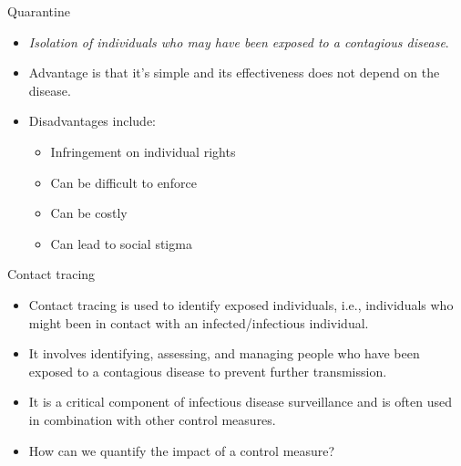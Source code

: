 \documentclass[
  ignorenonframetext,
]{beamer}
\providecommand{\tightlist}{%
  \setlength{\itemsep}{0pt}\setlength{\parskip}{0pt}}\usepackage{longtable,booktabs,array}
\begin{document}
\begin{frame}
\begin{block}{Quarantine}
\label{quarantine}
\begin{itemize}
\tightlist
\item
  \emph{Isolation of individuals who may have been exposed to a
  contagious disease}.
\item
  Advantage is that it's simple and its effectiveness does not depend on
  the disease.
\item
  Disadvantages include:

  \begin{itemize}
  \tightlist
  \item
    Infringement on individual rights
  \item
    Can be difficult to enforce
  \item
    Can be costly
  \item
    Can lead to social stigma
  \end{itemize}
\end{itemize}
\end{block}
\end{frame}

\begin{frame}
\begin{block}{Contact tracing}
\label{contact-tracing}
\begin{itemize}
\tightlist
\item
  Contact tracing is used to identify exposed individuals, i.e.,
  individuals who might been in contact with an infected/infectious
  individual.
\item
  It involves identifying, assessing, and managing people who have been
  exposed to a contagious disease to prevent further transmission.
\item
  It is a critical component of infectious disease surveillance and is
  often used in combination with other control measures.
\end{itemize}
\end{block}
\end{frame}

\begin{frame}
\begin{tcolorbox}[enhanced jigsaw, toprule=.15mm, opacityback=0, bottomtitle=1mm, opacitybacktitle=0.6, colframe=quarto-callout-caution-color-frame, titlerule=0mm, breakable, colback=white, title={Discussion}, left=2mm, colbacktitle=quarto-callout-caution-color!10!white, arc=.35mm, coltitle=black, bottomrule=.15mm, rightrule=.15mm, leftrule=.75mm, toptitle=1mm]

\begin{itemize}
\tightlist
\item
  How can we quantify the impact of a control measure?
\end{itemize}

\end{tcolorbox}
\end{frame}
\end{document}
